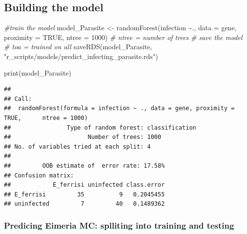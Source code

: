 \documentclass[
]{article}
\newenvironment{Shaded}{\begin{snugshade}}{\end{snugshade}}
\newcommand{\AttributeTok}[1]{\textcolor[rgb]{0.77,0.63,0.00}{#1}}
\newcommand{\CommentTok}[1]{\textcolor[rgb]{0.56,0.35,0.01}{\textit{#1}}}
\newcommand{\ConstantTok}[1]{\textcolor[rgb]{0.00,0.00,0.00}{#1}}
\newcommand{\DecValTok}[1]{\textcolor[rgb]{0.00,0.00,0.81}{#1}}
\newcommand{\FunctionTok}[1]{\textcolor[rgb]{0.00,0.00,0.00}{#1}}
\newcommand{\NormalTok}[1]{#1}
\newcommand{\OtherTok}[1]{\textcolor[rgb]{0.56,0.35,0.01}{#1}}
\newcommand{\SpecialCharTok}[1]{\textcolor[rgb]{0.00,0.00,0.00}{#1}}
\newcommand{\StringTok}[1]{\textcolor[rgb]{0.31,0.60,0.02}{#1}}
\begin{document}
\hypertarget{building-the-model-2}{%
\subsection{Building the model}\label{building-the-model-2}}

\begin{Shaded}
\begin{Highlighting}[]
\CommentTok{\#train the model}
\NormalTok{model\_Parasite }\OtherTok{\textless{}{-}} \FunctionTok{randomForest}\NormalTok{(infection }\SpecialCharTok{\textasciitilde{}}\NormalTok{., }\AttributeTok{data =}\NormalTok{ gene, }
                                    \AttributeTok{proximity =} \ConstantTok{TRUE}\NormalTok{, }\AttributeTok{ntree =} \DecValTok{1000}\NormalTok{) }
\CommentTok{\# ntree = number of trees     }
\CommentTok{\# save the model }
\CommentTok{\# toa = trained on all}
\FunctionTok{saveRDS}\NormalTok{(model\_Parasite, }\StringTok{"r\_scripts/models/predict\_infecting\_parasite.rds"}\NormalTok{)}

\FunctionTok{print}\NormalTok{(model\_Parasite)}
\end{Highlighting}
\end{Shaded}

\begin{verbatim}
## 
## Call:
##  randomForest(formula = infection ~ ., data = gene, proximity = TRUE,      ntree = 1000) 
##                Type of random forest: classification
##                      Number of trees: 1000
## No. of variables tried at each split: 4
## 
##         OOB estimate of  error rate: 17.58%
## Confusion matrix:
##            E_ferrisi uninfected class.error
## E_ferrisi         35          9   0.2045455
## uninfected         7         40   0.1489362
\end{verbatim}

\hypertarget{predicing-eimeria-mc-splliting-into-training-and-testing}{%
\subsubsection{Predicing Eimeria MC: splliting into training and
testing}\label{predicing-eimeria-mc-splliting-into-training-and-testing}}

\begin{Shaded}
\end{Shaded}
\end{document}
